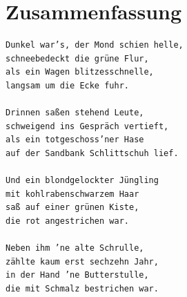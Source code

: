 
\chapter*{Zusammenfassung}

\begin{verbatim}
Dunkel war’s, der Mond schien helle,
schneebedeckt die grüne Flur,
als ein Wagen blitzesschnelle,
langsam um die Ecke fuhr.

Drinnen saßen stehend Leute,
schweigend ins Gespräch vertieft,
als ein totgeschoss’ner Hase
auf der Sandbank Schlittschuh lief.

Und ein blondgelockter Jüngling
mit kohlrabenschwarzem Haar
saß auf einer grünen Kiste,
die rot angestrichen war.

Neben ihm ’ne alte Schrulle,
zählte kaum erst sechzehn Jahr,
in der Hand ’ne Butterstulle,
die mit Schmalz bestrichen war.
\end{verbatim}